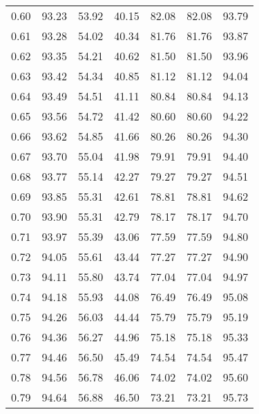 \begin{tabular}{|c|c|c|c|c|c|c|}
      0.60 &     93.23 &     53.92 &      40.15 &   82.08 &      82.08 &         93.79 \\
      0.61 &     93.28 &     54.02 &      40.34 &   81.76 &      81.76 &         93.87 \\
      0.62 &     93.35 &     54.21 &      40.62 &   81.50 &      81.50 &         93.96 \\
      0.63 &     93.42 &     54.34 &      40.85 &   81.12 &      81.12 &         94.04 \\
      0.64 &     93.49 &     54.51 &      41.11 &   80.84 &      80.84 &         94.13 \\
      0.65 &     93.56 &     54.72 &      41.42 &   80.60 &      80.60 &         94.22 \\
      0.66 &     93.62 &     54.85 &      41.66 &   80.26 &      80.26 &         94.30 \\
      0.67 &     93.70 &     55.04 &      41.98 &   79.91 &      79.91 &         94.40 \\
      0.68 &     93.77 &     55.14 &      42.27 &   79.27 &      79.27 &         94.51 \\
      0.69 &     93.85 &     55.31 &      42.61 &   78.81 &      78.81 &         94.62 \\
      0.70 &     93.90 &     55.31 &      42.79 &   78.17 &      78.17 &         94.70 \\
      0.71 &     93.97 &     55.39 &      43.06 &   77.59 &      77.59 &         94.80 \\
      0.72 &     94.05 &     55.61 &      43.44 &   77.27 &      77.27 &         94.90 \\
      0.73 &     94.11 &     55.80 &      43.74 &   77.04 &      77.04 &         94.97 \\
      0.74 &     94.18 &     55.93 &      44.08 &   76.49 &      76.49 &         95.08 \\
      0.75 &     94.26 &     56.03 &      44.44 &   75.79 &      75.79 &         95.19 \\
      0.76 &     94.36 &     56.27 &      44.96 &   75.18 &      75.18 &         95.33 \\
      0.77 &     94.46 &     56.50 &      45.49 &   74.54 &      74.54 &         95.47 \\
      0.78 &     94.56 &     56.78 &      46.06 &   74.02 &      74.02 &         95.60 \\
      0.79 &     94.64 &     56.88 &      46.50 &   73.21 &      73.21 &         95.73 \\

\end{tabular}
